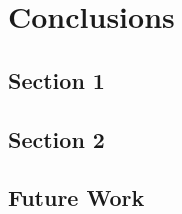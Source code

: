 %
\chapter{Conclusions}
\label{sec:conclusions}

\blindtext

\section{Section 1}
\label{sec:conclusions:sec1}

\blindtext

\section{Section 2}
\label{sec:conclusions:sec2}

\blindtext

\section{Future Work}
\label{sec:conclusions:future}

\blindtext
